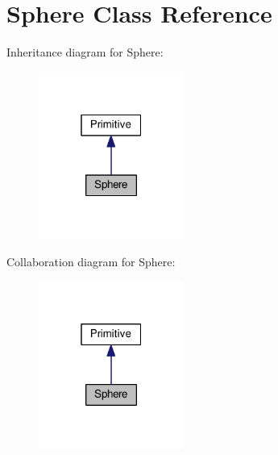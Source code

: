\hypertarget{class_sphere}{}\section{Sphere Class Reference}
\label{class_sphere}


Inheritance diagram for Sphere\+:\nopagebreak
\begin{figure}[H]
\begin{center}
\leavevmode
\includegraphics[width=135pt]{class_sphere__inherit__graph}
\end{center}
\end{figure}


Collaboration diagram for Sphere\+:\nopagebreak
\begin{figure}[H]
\begin{center}
\leavevmode
\includegraphics[width=135pt]{class_sphere__coll__graph}
\end{center}
\end{figure}
